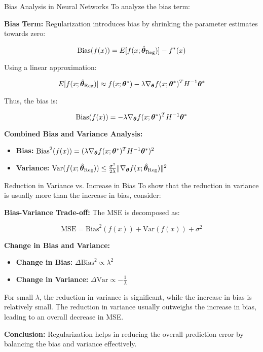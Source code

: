 \documentclass[11pt,compress,t,notes=noshow, xcolor=table]{beamer}
\begin{document}
\begin{vbframe}{Bias Analysis in Neural Networks}
To analyze the bias term:

\textbf{Bias Term:}
Regularization introduces bias by shrinking the parameter estimates towards zero:

\[
\text{Bias}(f(x)) = E[f(x; \hat{\bm{\theta}}_{\text{Reg}})] - f^*(x)
\]

Using a linear approximation:

\[
E[f(x; \hat{\bm{\theta}}_{\text{Reg}})] \approx f(x; \bm{\theta}^*) - \lambda \nabla_{\bm{\theta}} f(x; \bm{\theta}^*)^T H^{-1} \bm{\theta}^*
\]

Thus, the bias is:

\[
\text{Bias}(f(x)) = -\lambda \nabla_{\bm{\theta}} f(x; \bm{\theta}^*)^T H^{-1} \bm{\theta}^*
\]

\textbf{Combined Bias and Variance Analysis:}
\begin{itemize}
    \item \textbf{Bias:} \( \text{Bias}^2(f(x)) = (\lambda \nabla_{\bm{\theta}} f(x; \bm{\theta}^*)^T H^{-1} \bm{\theta}^*)^2 \)
    \item \textbf{Variance:} \( \text{Var}(f(x; \hat{\bm{\theta}}_{\text{Reg}})) \leq \frac{\sigma^2}{2\lambda} \|\nabla_{\bm{\theta}} f(x; \hat{\bm{\theta}}_{\text{Reg}})\|^2 \)
\end{itemize}
\end{vbframe}

\begin{vbframe}{Reduction in Variance vs. Increase in Bias}
To show that the reduction in variance is usually more than the increase in bias, consider:

\textbf{Bias-Variance Trade-off:}
The MSE is decomposed as:

\[
\text{MSE} = \text{Bias}^2(f(x)) + \text{Var}(f(x)) + \sigma^2
\]

\textbf{Change in Bias and Variance:}
\begin{itemize}
    \item \textbf{Change in Bias:} \( \Delta \text{Bias}^2 \propto \lambda^2 \)
    \item \textbf{Change in Variance:} \( \Delta \text{Var} \propto -\frac{1}{\lambda} \)
\end{itemize}

For small \(\lambda\), the reduction in variance is significant, while the increase in bias is relatively small. The reduction in variance usually outweighs the increase in bias, leading to an overall decrease in MSE.

\textbf{Conclusion:}
Regularization helps in reducing the overall prediction error by balancing the bias and variance effectively.
\end{vbframe}
\end{document}
